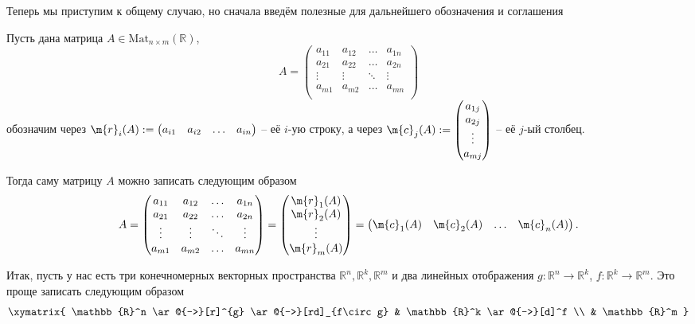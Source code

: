 Теперь мы приступим к общему случаю, но сначала введём полезные для дальнейшего обозначения и соглашения

Пусть дана матрица $A\in \mathrm{Mat}_{n\times m}(\mathbb{R})$, 
\[
A = \begin{pmatrix}
    a_{11} & a_{12} & \ldots & a_{1n} \\
    a_{21} & a_{22} & \ldots & a_{2n} \\
    \vdots & \vdots & \ddots & \vdots \\
    a_{m1} & a_{m2} & \ldots & a_{mn} \\
\end{pmatrix}
\]
обозначим через $\m{r}_i(A):= \begin{pmatrix}
    a_{i1} & a_{i2} & \ldots & a_{in}
\end{pmatrix}$ -- её $i$-ую строку, а через $\m{c}_j(A) : = \begin{pmatrix}
    a_{1j}\\a_{2j}\\\vdots \\a_{mj}
\end{pmatrix}$ -- её $j$-ый столбец.

Тогда саму матрицу $A$ можно записать следующим образом
\[
A = \begin{pmatrix}
    a_{11} & a_{12} & \ldots & a_{1n} \\
    a_{21} & a_{22} & \ldots & a_{2n} \\
    \vdots & \vdots & \ddots & \vdots \\
    a_{m1} & a_{m2} & \ldots & a_{mn} \\
\end{pmatrix} = \begin{pmatrix}
    \m{r}_1(A) \\
    \m{r}_2(A) \\
    \vdots \\
    \m{r}_m(A)
\end{pmatrix} = \begin{pmatrix}
    \m{c}_1(A) & \m{c}_2(A) & \ldots & \m{c}_n(A)
\end{pmatrix}.
\]

Итак, пусть у нас есть три конечномерных векторных пространства $\mathbb{R}^n, \mathbb{R}^k, \mathbb{R}^m$ и два линейных отображения $g: \mathbb{R}^n \to \mathbb{R}^k$, $f:\mathbb{R}^k \to \mathbb{R}^m$. Это проще записать следующим образом
\[
 \xymatrix{
 \mathbb{R}^n \ar@{->}[r]^{g} \ar@{->}[rd]_{f\circ g} & \mathbb{R}^k \ar@{->}[d]^f \\
 & \mathbb{R}^m
 }
\]

